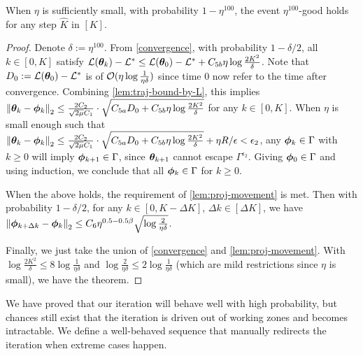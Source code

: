 \begin{lemma}
    When $\eta$ is sufficiently small, with probability $1 - \eta^{100}$, the event $\eta^{100}$-good holds for any step $\hat{K}$ in $[K]$.
\end{lemma}
\begin{proof}
    Denote $\delta:=\eta^{100}$. From \cref{convergence}, with probability $1 - \delta/2$, all $k \in [0, K]$ satisfy $\mathcal{L}({\bm{\theta}}_k) - \mathcal{L}^* \leq \mathcal{L}({\bm{\theta}}_0) - \mathcal{L}^* + C_{5b} \eta \log \frac{2K^2}{\delta}$. Note that $D_0 : = \mathcal{L}({\bm{\theta}}_0) - \mathcal{L}^*$ is of $\mathcal{O}(\eta \log \frac{1}{\eta\delta})$ since time $0$ now refer to the time after convergence. Combining \cref{lem:traj-bound-by-L}, this implies $\left\|{\bm{\theta}}_k - {\bm{\phi}}_k\right\|_2 \leq \frac{2C_2}{\sqrt{2\mu}C_1}\cdot \sqrt{C_{5a}D_0 + C_{5b} \eta \log \frac{2K^2}{\delta}}$ for any $k \in [0, K]$. When $\eta$ is small enough such that $\left\|{\bm{\theta}}_k - {\bm{\phi}}_k\right\|_2 \leq \frac{2C_2}{\sqrt{2\mu}C_1}\cdot \sqrt{C_{5a}D_0 + C_{5b} \eta \log \frac{2K^2}{\delta}} + \eta R/\epsilon < \epsilon_2$, any ${\bm{\phi}}_k \in \Gamma$ with $k \geq 0$ will imply ${\bm{\phi}}_{k+1} \in \Gamma$, since ${\bm{\theta}}_{k+1}$ cannot escape $\Gamma^{\epsilon_2}$. Giving ${\bm{\phi}}_0 \in \Gamma$ and using induction, we conclude that all ${\bm{\phi}}_k \in \Gamma$ for $k \geq 0$.

    When the above holds, the requirement of  \cref{lem:proj-movement} is met. Then with probability $1 - \delta/2$, for any $k \in [0, K - \Delta K]$, $\Delta k \in [\Delta K]$, we have $\left\|{\bm{\phi}}_{k+\Delta k} - {\bm{\phi}}_k\right\|_2 \leq C_6 \eta^{0.5-0.5\beta} \sqrt{\log \frac{2}{\eta\delta}}$.

    Finally, we just take the union of \cref{convergence} and \cref{lem:proj-movement}. With $\log \frac{2K^2}{\delta} \leq 8\log \frac{1}{\eta\delta}$ and $\log \frac{2}{\eta\delta} \leq 2\log\frac{1}{\eta\delta}$ (which are mild restrictions since $\eta$ is small), we have the theorem.
\end{proof}

We have proved that our iteration will behave well with high probability, but chances still exist that the iteration is driven out of working zones and becomes intractable. We define a well-behaved sequence that manually redirects the iteration when extreme cases happen. 

